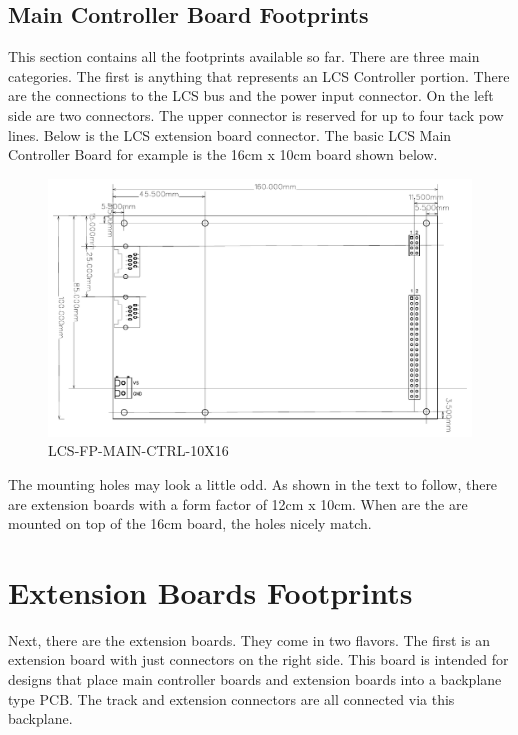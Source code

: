 \subsection{Main Controller Board Footprints}

This section contains all the footprints available so far. There are three main categories. The first is anything that represents an LCS Controller portion. There are the connections to the LCS bus and the power input connector. On the left side are two connectors. The upper connector is reserved for up to four tack pow lines. Below is the LCS extension board connector. The basic LCS Main Controller Board for example is the 16cm x 10cm board shown below.

\begin{figure}[htbp]
    \centering
    \includegraphics[page=1, scale=0.7]{./Figures/LCS-FP-MAIN-CTRL-10X16.pdf}
    \caption{LCS-FP-MAIN-CTRL-10X16}
\end{figure}

\FloatBarrier

The mounting holes may look a little odd. As shown in the text to follow, there are extension boards with a form factor of 12cm x 10cm. When are the are mounted on top of the 16cm board, the holes nicely match. 

\section{Extension Boards Footprints}

Next, there are the extension boards. They come in two flavors. The first is an extension board with just connectors on the right side. 
This board is intended for designs that place main controller boards and extension boards into a backplane type PCB. The track and extension connectors are all connected via this backplane.

